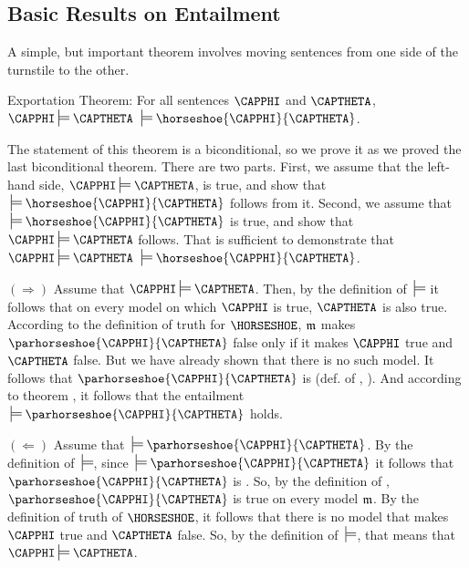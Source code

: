 \subsection{Basic Results on Entailment}\label{Basic Results on Entailment} 
A simple, but important theorem involves moving sentences from one side of the turnstile to the other.
\begin{THEOREM}{ \GSL{} Exportation Theorem:} For all \GSL{} sentences $\CAPPHI$ and $\CAPTHETA$, $\CAPPHI\sdtstile{}{}\CAPTHETA$ \Iff $\:\sdtstile{}{}\horseshoe{\CAPPHI}{\CAPTHETA}$.
\end{THEOREM}
\begin{commentary}
	The statement of this theorem is a biconditional, so we prove it as we proved the last biconditional theorem.
	There are two parts.
	First, we assume that the left-hand side, $\CAPPHI\sdtstile{}{}\CAPTHETA$, is true, and show that $\:\sdtstile{}{}\horseshoe{\CAPPHI}{\CAPTHETA}$ follows from it. 
	Second, we assume that $\:\sdtstile{}{}\horseshoe{\CAPPHI}{\CAPTHETA}$ is true, and show that $\CAPPHI\sdtstile{}{}\CAPTHETA$ follows.
	That is sufficient to demonstrate that $\CAPPHI\sdtstile{}{}\CAPTHETA$ \Iff $\:\sdtstile{}{}\horseshoe{\CAPPHI}{\CAPTHETA}$.
\end{commentary}
\begin{PROOF}
$(\Rightarrow)$ Assume that $\CAPPHI\sdtstile{}{}\CAPTHETA$.
Then, by the definition of $\:\sdtstile{}{}$ it follows that on every model on which $\CAPPHI$ is true, $\CAPTHETA$ is also true.
According to the definition of truth for $\HORSESHOE$, $\mathfrak{m}$ makes $\parhorseshoe{\CAPPHI}{\CAPTHETA}$ false only if it makes $\CAPPHI$ true and $\CAPTHETA$ false.
But we have already shown that there is no such model.
It follows that $\parhorseshoe{\CAPPHI}{\CAPTHETA}$ is  (def. of , ).
And according to theorem , it follows that the entailment $\:\sdtstile{}{}\parhorseshoe{\CAPPHI}{\CAPTHETA}$ holds.

$(\Leftarrow)$ Assume that $\:\sdtstile{}{}\parhorseshoe{\CAPPHI}{\CAPTHETA}$.
By the definition of $\:\sdtstile{}{}$, since $\:\sdtstile{}{}\parhorseshoe{\CAPPHI}{\CAPTHETA}$ it follows that $\parhorseshoe{\CAPPHI}{\CAPTHETA}$ is .  So, by the definition of , $\parhorseshoe{\CAPPHI}{\CAPTHETA}$ is true on every model $\mathfrak{m}$.
By the definition of truth of $\HORSESHOE$, it follows that there is no model that makes $\CAPPHI$ true and $\CAPTHETA$ false.  So, by the definition of $\:\sdtstile{}{}$, that means that $\CAPPHI\sdtstile{}{}\CAPTHETA$.
\end{PROOF}

